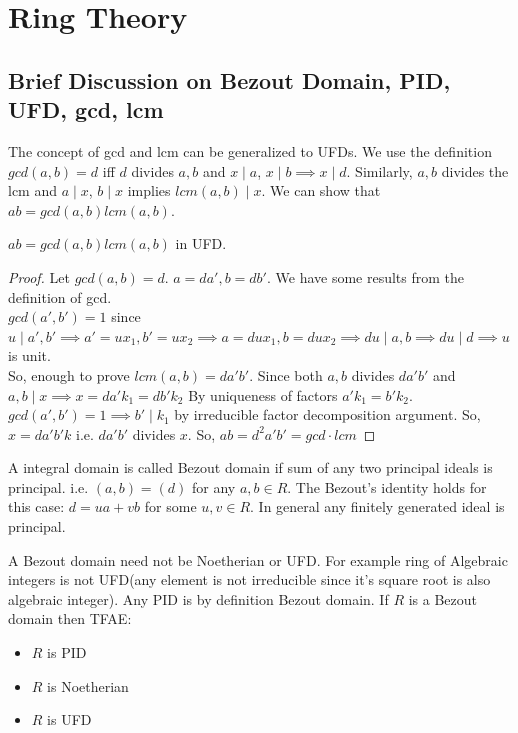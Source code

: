 \chapter{Ring Theory}
\setcounter{equation}{0}
\setcounter{table}{0}
\setcounter{figure}{0}

\section{Brief Discussion on Bezout Domain, PID, UFD, gcd, lcm}
The concept of gcd and lcm can be generalized to UFDs. We use the definition $ gcd(a,b)=d $ iff $ d $ divides $ a,b $ and $ x\mid a$, $x\mid b \implies x\mid d $. Similarly, $ a,b $ divides the lcm and  $ a\mid x $, $ b\mid x $ implies $ lcm(a,b)\mid x $. We can show that $ ab= gcd(a,b)lcm(a,b) $. 
\begin{theorem}
	$ ab= gcd(a,b)lcm(a,b) $ in UFD.
\end{theorem}
\begin{proof}
	Let $ gcd(a,b)=d $. $ a=da',b=db' $. We have some results from the definition of gcd.\\
	$ gcd(a',b')=1 $ since $ u\mid a',b' \implies a'=ux_1, b'=ux_2 \implies a= dux_1, b= dux_2 \implies du\mid a,b\implies du\mid d \implies u$ is unit.\\
	So, enough to prove $ lcm(a,b) = da'b' $. Since both $ a,b $ divides $ da'b' $ and $ a,b \mid x \implies x=da'k_1=db'k_2$ By uniqueness of factors $ a'k_1= b'k_2 $. $ gcd(a',b')=1 \implies b'\mid k_1 $ by irreducible factor decomposition argument. So, $ x=da'b'k $ i.e. $ da'b' $ divides $ x $. So, $ ab=d^2a'b'= gcd\cdot lcm $ 
\end{proof}
\begin{definition}
	A integral domain is called Bezout domain if sum of any two principal ideals is principal. i.e. $ (a,b)=(d) $ for any $ a,b\in R $. The Bezout's identity holds for this case: $ d= ua+vb $ for some $ u,v\in R $. In general any finitely generated ideal is principal.
\end{definition}

A Bezout domain need not be Noetherian or UFD. For example ring of Algebraic integers is not UFD(any element is not irreducible since it's square root is also algebraic integer). Any PID is by definition Bezout domain. If $ R $ is a Bezout domain then TFAE:
\begin{itemize}
	\item $ R $ is PID
	\item $ R $ is Noetherian 
	\item $ R $ is UFD
\end{itemize}

